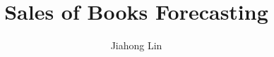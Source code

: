 \documentclass{amsart}
\begin{document}
%
%
\title[A Short Running Title]{Sales of Books Forecasting}%

\author{Jiahong Lin}
\address[A.~1]{School of Economics and Management,\\ 
Nanjing University of Science and Technology, China}%



%
\date{\gitAuthorDate}%




\maketitle
\tableofcontents

\newpage



\newpage
%
%
\end{document}
